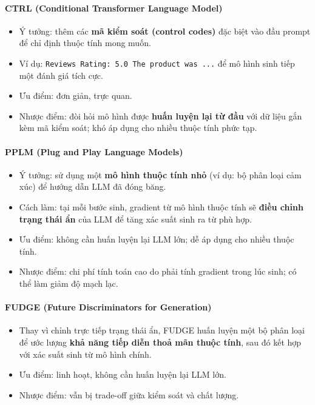 \paragraph{CTRL (Conditional Transformer Language Model)}
\begin{itemize}
    \item Ý tưởng: thêm các \textbf{mã kiểm soát (control codes)} đặc biệt vào đầu prompt để chỉ định thuộc tính mong muốn. 
    \item Ví dụ: \texttt{Reviews Rating: 5.0 The product was ...} để mô hình sinh tiếp một đánh giá tích cực.
    \item Ưu điểm: đơn giản, trực quan.
    \item Nhược điểm: đòi hỏi mô hình được \textbf{huấn luyện lại từ đầu} với dữ liệu gắn kèm mã kiểm soát; khó áp dụng cho nhiều thuộc tính phức tạp.
\end{itemize}

\paragraph{PPLM (Plug and Play Language Models)}
\begin{itemize}
    \item Ý tưởng: sử dụng một \textbf{mô hình thuộc tính nhỏ} (ví dụ: bộ phân loại cảm xúc) để hướng dẫn LLM đã đóng băng. 
    \item Cách làm: tại mỗi bước sinh, gradient từ mô hình thuộc tính sẽ \textbf{điều chỉnh trạng thái ẩn} của LLM để tăng xác suất sinh ra từ phù hợp.
    \item Ưu điểm: không cần huấn luyện lại LLM lớn; dễ áp dụng cho nhiều thuộc tính.
    \item Nhược điểm: chi phí tính toán cao do phải tính gradient trong lúc sinh; có thể làm giảm độ mạch lạc.
\end{itemize}

\paragraph{FUDGE (Future Discriminators for Generation)}
\begin{itemize}
    \item Thay vì chỉnh trực tiếp trạng thái ẩn, FUDGE huấn luyện một bộ phân loại để ước lượng \textbf{khả năng tiếp diễn thoả mãn thuộc tính}, sau đó kết hợp với xác suất sinh từ mô hình chính.
    \item Ưu điểm: linh hoạt, không cần huấn luyện lại LLM lớn.
    \item Nhược điểm: vẫn bị trade-off giữa kiểm soát và chất lượng.
\end{itemize}


